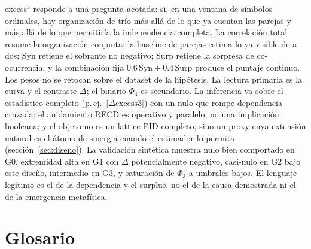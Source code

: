 \documentclass[11pt,a4paper]{article}
\begin{document}
excess$^3$ responde a una pregunta acotada: si, en una ventana de s\'imbolos
ordinales, hay organizaci\'on de tr\'io m\'as all\'a de lo que ya cuentan las
parejas y m\'as all\'a de lo que permitir\'ia la independencia completa. La
correlaci\'on total resume la organizaci\'on conjunta; la baseline de parejas
estima lo ya visible de a dos; $\mathrm{Syn}$ retiene el sobrante no
negativo; $\mathrm{Surp}$ retiene la sorpresa de co-ocurrencia; y la
combinaci\'on fija $0.6\,\mathrm{Syn}+0.4\,\mathrm{Surp}$ produce el
puntaje continuo. Los pesos no se retocan sobre el dataset de la hip\'otesis.
La lectura primaria es la curva y el contraste $\Delta$; el binario
$\Phi_3$ es secundario. La inferencia va sobre el estad\'istico completo
(p.\,ej.\ $|\Delta\mathrm{excess3}|$) con un nulo que rompe dependencia
cruzada; el anidamiento RECD es operativo y paralelo, no una implicaci\'on
booleana; y el objeto no es un lattice PID completo, sino un proxy cuya
extensi\'on natural es el \'atomo de sinergia cuando el estimador lo permita
(secci\'on~\ref{sec:diseno}). La validaci\'on sint\'etica muestra nulo bien
comportado en G0, extremidad alta en G1 con $\Delta$ potencialmente
negativo, casi-nulo en G2 bajo este dise\~no, intermedio en G3, y saturaci\'on
de $\Phi_3$ a umbrales bajos. El lenguaje leg\'itimo es el de la dependencia
y el surplus, no el de la causa demostrada ni el de la emergencia
metaf\'isica.

\section{Glosario}
\label{sec:glosario}
\end{document}
